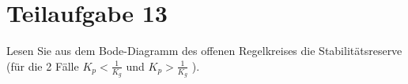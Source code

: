\section{Teilaufgabe 13}
\begin{aufgabe}
Lesen Sie aus dem Bode-Diagramm des offenen Regelkreises die 
Stabilitätsreserve (für die 2 Fälle $K_p < \frac{1}{K_g}$ und 
$K_p > \frac{1}{K_g}$ ).
\end{aufgabe}
